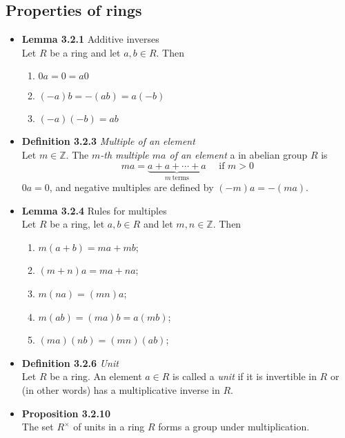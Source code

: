 \documentclass[11pt,a4paper]{article}
\begin{document}
\subsection{Properties of rings}

\begin{itemize}

    \item \textbf{Lemma 3.2.1} Additive inverses \\
        Let $R$ be a ring and let $a, b \in R$.
        Then
        \begin{enumerate}
            \item $0a = 0 = a0$
            \item $(-a)b = -(ab) = a(-b)$
            \item $(-a)(-b) = ab$
        \end{enumerate}

    \item \textbf{Definition 3.2.3} \emph{Multiple of an element} \\
        Let $m \in \mathbb{Z}$.
        The \emph{$m$-th multiple $ma$ of an element} a in abelian group $R$ is
        \[
            ma = \underbrace{a + a + \cdots + a}_{m \ \text{terms}} \quad \text{ if } m > 0
        \]
        $0a = 0$, and negative multiples are defined by $(-m)a = -(ma)$.

    \item \textbf{Lemma 3.2.4} Rules for multiples \\
        Let $R$ be a ring, let $a,b \in R$ and let $m,n \in \mathbb{Z}$.
        Then
        \begin{enumerate}
            \item $m(a+b)   = ma + mb$;
            \item $(m+n)a   = ma + na$;
            \item $m(na)    = (mn)a$;
            \item $m(ab)    = (ma)b      = a(mb)$;
            \item $(ma)(nb) = (mn)(ab)$;
        \end{enumerate}

    \item \textbf{Definition 3.2.6} \emph{Unit} \\
        Let $R$ be a ring.
        An element $a \in R$ is called a \emph{unit} if it is invertible in $R$ or (in other
        words) has a multiplicative inverse in $R$.

    \item \textbf{Proposition 3.2.10} \\
        The set $R^\times$ of units in a ring $R$ forms a group under multiplication.


\end{itemize}
\end{document}
